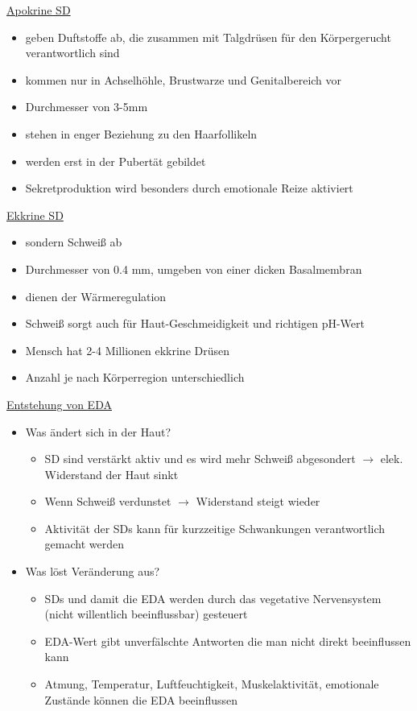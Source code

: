 \documentclass[a4paper,10pt,oneside]{article}
\begin{document}
\underline{Apokrine SD} \\
	\begin{itemize}
		\item geben Duftstoffe ab, die zusammen mit Talgdrüsen für den Körpergerucht verantwortlich sind
		\item kommen nur in Achselhöhle, Brustwarze und Genitalbereich vor
		\item Durchmesser von 3-5mm
		\item stehen in enger Beziehung zu den Haarfollikeln
		\item werden erst in der Pubertät gebildet
		\item Sekretproduktion wird besonders durch emotionale Reize aktiviert
	\end{itemize}
	
\underline{Ekkrine SD} \\
	\begin{itemize}
		\item sondern Schweiß ab
		\item Durchmesser von 0.4 mm, umgeben von einer dicken Basalmembran
		\item dienen der Wärmeregulation
		\item Schweiß sorgt auch für Haut-Geschmeidigkeit und richtigen pH-Wert
		\item Mensch hat 2-4 Millionen ekkrine Drüsen
		\item Anzahl je nach Körperregion unterschiedlich
	\end{itemize}
	
\underline{Entstehung von EDA} \\
	\begin{itemize}
		\item Was ändert sich in der Haut?
			\begin{itemize}
				\item SD sind verstärkt aktiv und es wird mehr Schweiß abgesondert $\rightarrow$ elek. Widerstand der Haut sinkt
				\item Wenn Schweiß verdunstet $\rightarrow$ Widerstand steigt wieder
				\item Aktivität der SDs kann für kurzzeitige Schwankungen verantwortlich gemacht werden
			\end{itemize}
		\item Was löst Veränderung aus?
			\begin{itemize}
				\item SDs und damit die EDA werden durch das vegetative Nervensystem (nicht willentlich beeinflussbar) gesteuert
				\item EDA-Wert gibt unverfälschte Antworten die man nicht direkt beeinflussen kann
				\item Atmung, Temperatur, Luftfeuchtigkeit, Muskelaktivität, emotionale Zustände können die EDA beeinflussen
			\end{itemize}
	\end{itemize}
\end{document}
